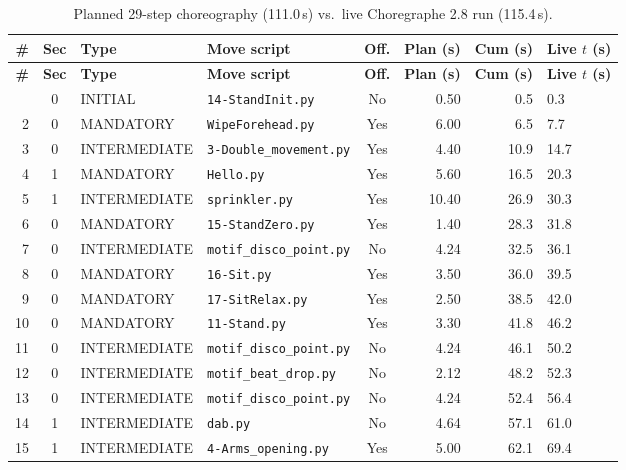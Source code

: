 \documentclass[11pt,a4paper]{article}
\newcommand{\code}[1]{\texttt{#1}}
\begin{document}
{\footnotesize
\setlength{\tabcolsep}{4pt}
\begin{longtable}{r c l l c r r l}
  \caption{Planned 29-step choreography (111.0\,s) vs.\ live Choregraphe 2.8 run (115.4\,s).} \label{tab:plan} \\
  \toprule
  \textbf{\#} & \textbf{Sec} & \textbf{Type} & \textbf{Move script} & \textbf{Off.} & \textbf{Plan (s)} & \textbf{Cum (s)} & \textbf{Live $t$ (s)} \\
  \midrule
  \endfirsthead
  \toprule
  \textbf{\#} & \textbf{Sec} & \textbf{Type} & \textbf{Move script} & \textbf{Off.} & \textbf{Plan (s)} & \textbf{Cum (s)} & \textbf{Live $t$ (s)} \\
  \midrule
  \endhead
  \bottomrule
  \endfoot
  1  & 0 & INITIAL      & \code{14-StandInit.py}        & No  & 0.50  & 0.5   & 0.3 \\
  2  & 0 & MANDATORY    & \code{WipeForehead.py}        & Yes & 6.00  & 6.5   & 7.7 \\
  3  & 0 & INTERMEDIATE & \code{3-Double\_movement.py}  & Yes & 4.40  & 10.9  & 14.7 \\
  4  & 1 & MANDATORY    & \code{Hello.py}               & Yes & 5.60  & 16.5  & 20.3 \\
  5  & 1 & INTERMEDIATE & \code{sprinkler.py}           & Yes & 10.40 & 26.9  & 30.3 \\
  6  & 0 & MANDATORY    & \code{15-StandZero.py}        & Yes & 1.40  & 28.3  & 31.8 \\
  7  & 0 & INTERMEDIATE & \code{motif\_disco\_point.py} & No  & 4.24  & 32.5  & 36.1 \\
  8  & 0 & MANDATORY    & \code{16-Sit.py}              & Yes & 3.50  & 36.0  & 39.5 \\
  9  & 0 & MANDATORY    & \code{17-SitRelax.py}         & Yes & 2.50  & 38.5  & 42.0 \\
  10 & 0 & MANDATORY    & \code{11-Stand.py}            & Yes & 3.30  & 41.8  & 46.2 \\
  11 & 0 & INTERMEDIATE & \code{motif\_disco\_point.py} & No  & 4.24  & 46.1  & 50.2 \\
  12 & 0 & INTERMEDIATE & \code{motif\_beat\_drop.py}   & No  & 2.12  & 48.2  & 52.3 \\
  13 & 0 & INTERMEDIATE & \code{motif\_disco\_point.py} & No  & 4.24  & 52.4  & 56.4 \\
  14 & 1 & INTERMEDIATE & \code{dab.py}                 & No  & 4.64  & 57.1  & 61.0 \\
  15 & 1 & INTERMEDIATE & \code{4-Arms\_opening.py}     & Yes & 5.00  & 62.1  & 69.4 \\

\end{longtable}}
\end{document}
